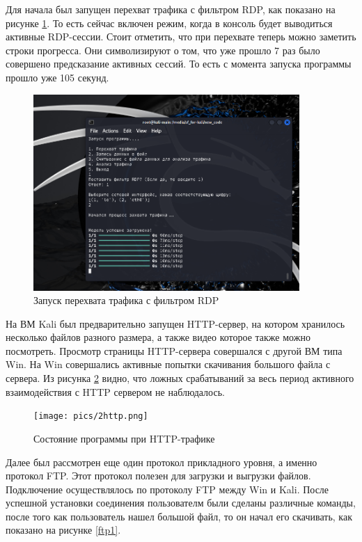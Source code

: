 \documentclass[bachelor, och, coursework]{SCWorks}
\begin{document}
Для начала был запущен перехват трафика с фильтром RDP, как показано на рисунке \ref{main1}. То есть сейчас включен режим, когда в консоль 
будет выводиться активные RDP-сессии. Стоит отметить, что при перехвате теперь можно заметить строки прогресса. Они символизируют о том, что
уже прошло 7 раз было совершено предсказание активных сессий. То есть с момента запуска программы прошло уже 105 секунд.

\begin{figure}[H]
  \centering
  \includegraphics[width=0.9\textwidth]{pics/main-view.png}
  \caption{Запуск перехвата трафика с фильтром RDP}
  \label{main1}
\end{figure}

На ВМ Kali был предварительно запущен HTTP-сервер, на котором хранилось несколько файлов разного размера, а также видео которое также можно посмотреть.
Просмотр страницы HTTP-сервера совершался с другой ВМ типа Win. На Win совершались активные попытки скачивания большого файла с сервера. Из рисунка \ref{http1}
видно, что ложных срабатываний за весь период активного взаимодействия с HTTP сервером не наблюдалось.

\begin{figure}[H]
  \centering
  \texttt{[image: pics/2http.png]}
  \caption{Состояние программы при HTTP-трафике}
  \label{http1}
\end{figure}


Далее был рассмотрен еще один протокол прикладного уровня, а именно протокол FTP. Этот протокол полезен для загрузки и выгрузки файлов. Подключение осуществлялось 
по протоколу FTP между Win и Kali. После успешной установки соединения пользователм были сделаны различные команды, после того как пользователь нашел большой файл, то
он начал его скачивать, как показано на рисунке \ref{ftp1}.
\end{document}
